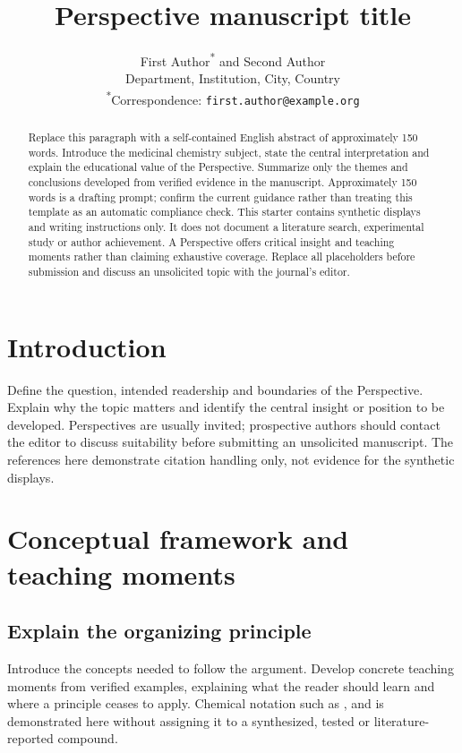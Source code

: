 \documentclass[letterpaper,12pt]{article}
\title{Perspective manuscript title}
\author{First Author\textsuperscript{*} and Second Author\\
  \small Department, Institution, City, Country\\
  \small \textsuperscript{*}Correspondence: \texttt{first.author@example.org}}
\date{}
\begin{document}
\maketitle
\begin{abstract}
Replace this paragraph with a self-contained English abstract of
approximately 150 words. Introduce the medicinal chemistry subject, state
the central interpretation and explain the educational value of the
Perspective. Summarize only the themes and conclusions developed from
verified evidence in the manuscript. Approximately 150 words is a drafting
prompt; confirm the current guidance rather than treating this template as
an automatic compliance check. This starter contains synthetic displays
and writing instructions only. It does not document a literature search,
experimental study or author achievement. A Perspective offers critical
insight and teaching moments rather than claiming exhaustive coverage.
Replace all placeholders before submission and discuss an unsolicited topic
with the journal's editor.
\end{abstract}

\section{Introduction}
Define the question, intended readership and boundaries of the Perspective.
Explain why the topic matters and identify the central insight or position
to be developed. Perspectives are usually invited; prospective authors
should contact the editor to discuss suitability before submitting an
unsolicited manuscript. The references here demonstrate citation handling
only, not evidence for the synthetic displays\cite{peng2011reproducible,wilkinson2016fair}.

\section{Conceptual framework and teaching moments}
\subsection{Explain the organizing principle}
Introduce the concepts needed to follow the argument. Develop concrete
teaching moments from verified examples, explaining what the reader should
learn and where a principle ceases to apply. Chemical notation such as
,  and  is demonstrated here without assigning it to
a synthesized, tested or literature-reported compound.
\end{document}
